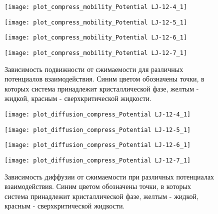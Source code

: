 \begin{figure}[h]
\begin{center}
\begin{minipage}[h]{0.45\linewidth}
\texttt{[image: plot\_compress\_mobility\_Potential LJ-12-4\_1]}
\end{minipage}
\begin{minipage}[h]{0.45\linewidth}
\texttt{[image: plot\_compress\_mobility\_Potential LJ-12-5\_1]}
\end{minipage}

\begin{minipage}[h]{0.45\linewidth}
\texttt{[image: plot\_compress\_mobility\_Potential LJ-12-6\_1]}
\end{minipage}
\begin{minipage}[h]{0.45\linewidth}
\texttt{[image: plot\_compress\_mobility\_Potential LJ-12-7\_1]}
\end{minipage}
\caption{Зависимость подвижности от сжимаемости для различных потенциалов взаимодействия. Синим цветом обозначены точки, в которых система принадлежит кристаллической фазе, желтым - жидкой, красным - сверхкритической жидкости.}
\label{risMuBeta}
\end{center}
\end{figure}


\begin{figure}[h]
\begin{center}
\begin{minipage}[h]{0.45\linewidth}
\texttt{[image: plot\_diffusion\_compress\_Potential LJ-12-4\_1]}
\end{minipage}
\begin{minipage}[h]{0.45\linewidth}
\texttt{[image: plot\_diffusion\_compress\_Potential LJ-12-5\_1]}
\end{minipage}

\begin{minipage}[h]{0.45\linewidth}
\texttt{[image: plot\_diffusion\_compress\_Potential LJ-12-6\_1]}
\end{minipage}
\begin{minipage}[h]{0.45\linewidth}
\texttt{[image: plot\_diffusion\_compress\_Potential LJ-12-7\_1]}
\end{minipage}
\caption{Зависимость диффузии от сжимаемости при различных потенциалах взаимодействия. Синим цветом обозначены точки, в которых система принадлежит кристаллической фазе, желтым - жидкой, красным - сверхкритической жидкости.}
\label{risDBeta}
\end{center}
\end{figure}



